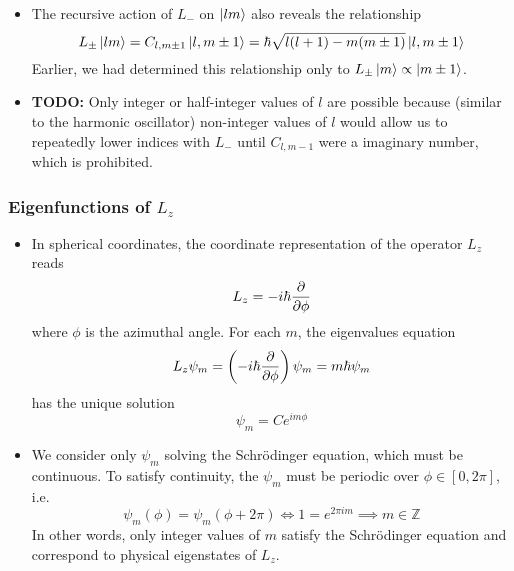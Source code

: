\documentclass[11pt, a4paper]{article}
\newcommand{\Schro}{Schr\"{o}dinger\xspace}
\newcommand{\p}{\psi}  %
\begin{document}
\begin{itemize}
	\item The recursive action of $ L_{-} $ on $ \ket{lm} $ also reveals the relationship
	\begin{equation*}
		L_{\pm}\ket{lm} = C_{l, m \pm 1} \ket{l, m \pm 1} = \hbar \sqrt{l (l+1) - m(m\pm 1)} \ket{l, m \pm 1}
	\end{equation*}
	Earlier, we had determined this relationship only to $ L_{\pm} \ket{m} \propto \ket{m \pm 1} $.
	
	\item \textbf{TODO:} Only integer or half-integer values of $ l $ are possible because (similar to the harmonic oscillator) non-integer values of $ l $  would allow us to repeatedly lower indices with $ L_{-} $ until $ C_{l, m-1} $ were a imaginary number, which is prohibited.
\end{itemize}


\subsubsection{Eigenfunctions of $ L_{z} $}
\begin{itemize}
	\item In spherical coordinates, the coordinate representation of the operator $ L_{z} $ reads
	\begin{equation*}
		L_{z} = - i \hbar \pdv{\phi}
	\end{equation*}
	where $ \phi $ is the azimuthal angle. For each $ m $, the eigenvalues equation
	\begin{equation*}
		L_{z} \p_{m} = \left(-i\hbar\pdv{\phi} \right)\p_{m} = m \hbar \p_{m}
	\end{equation*}
	has the unique solution
	\begin{equation*}
		\p_{m} = Ce^{im \phi}
	\end{equation*}
	
	\item We consider only $ \p_{m} $ solving the \Schro equation, which must be continuous. To satisfy continuity, the $ \p_{m} $ must be periodic over $ \phi \in [0, 2\pi] $, i.e.
	\begin{equation*}
		\p_{m}(\phi) = \p_{m}(\phi + 2\pi) \iff 1 = e^{2\pi i m}  \implies m \in \mathbb{Z}
	\end{equation*}
	In other words, only integer values of $ m $ satisfy the \Schro equation and correspond to physical eigenstates of $ L_{z} $.
	
\end{itemize}
\end{document}
